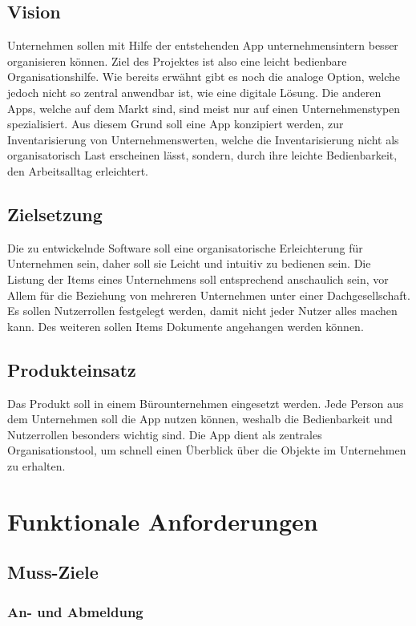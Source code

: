 \documentclass[11pt,a4paper]{report}
\begin{document}
\subsection{Vision}
Unternehmen sollen mit Hilfe der entstehenden App unternehmensintern besser organisieren können.
Ziel des Projektes ist also eine leicht bedienbare Organisationshilfe.
Wie bereits erwähnt gibt es noch die analoge Option, welche jedoch nicht so zentral anwendbar ist, wie eine digitale Lösung.
Die anderen Apps, welche auf dem Markt sind, sind meist nur auf einen Unternehmenstypen spezialisiert.
Aus diesem Grund soll eine App konzipiert werden, zur Inventarisierung von Unternehmenswerten, welche die Inventarisierung nicht als organisatorisch Last erscheinen lässt, sondern, durch ihre leichte Bedienbarkeit, den Arbeitsalltag erleichtert.
\subsection{Zielsetzung}
Die zu entwickelnde Software soll eine organisatorische Erleichterung für Unternehmen sein, daher soll sie Leicht und intuitiv zu bedienen sein. 
Die Listung der Items eines Unternehmens soll entsprechend anschaulich sein, vor Allem für die Beziehung von mehreren Unternehmen unter einer Dachgesellschaft. 
Es sollen Nutzerrollen festgelegt werden, damit nicht jeder Nutzer alles machen kann. 
Des weiteren sollen Items Dokumente angehangen werden können.
\subsection{Produkteinsatz}
Das Produkt soll in einem Bürounternehmen eingesetzt werden. 
Jede Person aus dem Unternehmen soll die App nutzen können, weshalb die Bedienbarkeit und Nutzerrollen besonders wichtig sind. 
Die App dient als zentrales Organisationstool, um schnell einen Überblick über die Objekte im Unternehmen zu erhalten.
\newpage

\section{Funktionale Anforderungen}

\subsection{Muss-Ziele}
\subsubsection{An- und Abmeldung}
\end{document}
